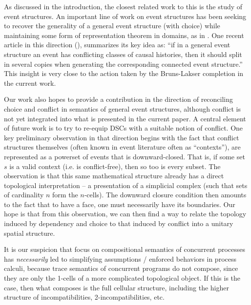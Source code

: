 \documentclass[hoptionsi,review,screen,format=acmsmall]{acmart}
\theoremstyle{definition}
\begin{document}
As discussed in the introduction, the closest related work to this is the study of event structures. An important line of work on event structures has been seeking to recover the generality of a general event structure (with choice) while maintaining some form of representation theorem in domains, as in \cite{nielsen1981petri}. One recent article in this direction (\cite{DBLP:journals/corr/abs-1802-03726}), summarizes its key idea as: ``if in a general event structure an event has conflicting classes of causal histories, then it should split in several copies when generating the corresponding connected event structure.'' This insight is very close to the action taken by the Bruns-Lakser completion in the current work.

Our work also hopes to provide a contribution in the direction of reconciling choice and conflict in semantics of  general event structures, although conflict is not yet integrated into what is presented in the current paper. A central element of future work is to try to re-equip DSCs with a suitable notion of conflict. One key preliminary observation in that direction begins with the fact that conflict structures themselves (often known in event literature often as ``contexts''), are represented as a powerset of events that is downward-closed. That is, if some set \(s\) is a valid context (i.e. is conflict-free), then so too is every subset. The observation is that this same mathematical structure already has a direct topological interpretation -- a presentation of a simplicial complex (such that sets of cardinality \(n\) form the \(n\)-cells). The downward closure condition then amounts to the fact that to have a face, one must necessarily have its boundaries. Our hope is that from this observation, we can then find a way to relate the topology induced by dependency and choice to that induced by conflict into a unitary spatial structure.

It is our suspicion that focus on compositional semantics of concurrent processes has \textit{necessarily} led to simplifying assumptions / enforced behaviors in process calculi, because trace semantics of concurrent programs do not compose, since they are only the 1-cells of a more complicated topological object. If this is the case, then what composes is the full cellular structure, including the higher structure of incompatibilities, 2-incompatibilities, etc.
\end{document}
